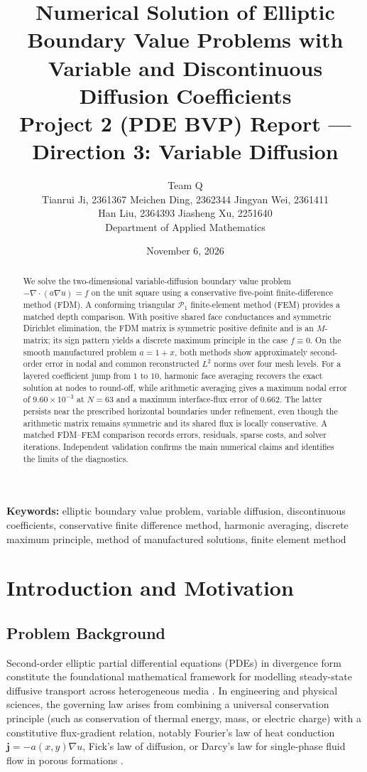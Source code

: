 \documentclass[11pt,a4paper]{article}
\title{\textbf{Numerical Solution of Elliptic Boundary Value Problems with Variable and Discontinuous Diffusion Coefficients}\\[2mm]
\large Project 2 (PDE BVP) Report --- Direction 3: Variable Diffusion}
\author{
    Team Q \\
    \small Tianrui Ji, 2361367 \quad Meichen Ding, 2362344 \quad Jingyan Wei, 2361411 \\
    \small Han Liu, 2364393 \quad Jiasheng Xu, 2251640 \\
    \small Department of Applied Mathematics
}
\date{November 6, 2026}
\theoremstyle{definition}
\theoremstyle{remark}
\begin{document}
\maketitle

\begin{abstract}
We solve the two-dimensional variable-diffusion boundary value problem
$-\nabla\cdot(a\nabla u)=f$ on the unit square using a conservative five-point
finite-difference method (FDM). A conforming triangular $\mathcal P_1$
finite-element method (FEM) provides a matched depth comparison. With positive
shared face conductances and symmetric Dirichlet elimination, the FDM matrix is
symmetric positive definite and is an $M$-matrix; its sign pattern yields a
discrete maximum principle in the case $f\equiv 0$. On the
smooth manufactured problem $a=1+x$, both methods show approximately second-order
error in nodal and common reconstructed $L^2$ norms over four mesh levels.
For a layered coefficient jump from $1$ to $10$, harmonic face averaging recovers
the exact solution at nodes to round-off, while arithmetic averaging gives a
maximum nodal error of $9.60\times10^{-3}$ at $N=63$ and a maximum interface-flux
error of $0.662$. The latter persists near the prescribed horizontal boundaries
under refinement, even though the arithmetic matrix remains symmetric and its
shared flux is locally conservative. A matched FDM--FEM comparison records errors,
residuals, sparse costs, and solver iterations. Independent validation confirms
the main numerical claims and identifies the limits of the diagnostics.
\end{abstract}

\noindent\textbf{Keywords:} elliptic boundary value problem, variable diffusion, discontinuous coefficients, conservative finite difference method, harmonic averaging, discrete maximum principle, method of manufactured solutions, finite element method

\tableofcontents
\newpage

\section{Introduction and Motivation}

\subsection{Problem Background}
Second-order elliptic partial differential equations (PDEs) in divergence form constitute the foundational mathematical framework for modelling steady-state diffusive transport across heterogeneous media \cite{hiptmair2025, quarteroni2017}. In engineering and physical sciences, the governing law arises from combining a universal conservation principle (such as conservation of thermal energy, mass, or electric charge) with a constitutive flux-gradient relation, notably Fourier's law of heat conduction $\bm{j} = -a(x,y)\nabla u$, Fick's law of diffusion, or Darcy's law for single-phase fluid flow in porous formations \cite{hackbusch2017, hiptmair2025}.
\end{document}
